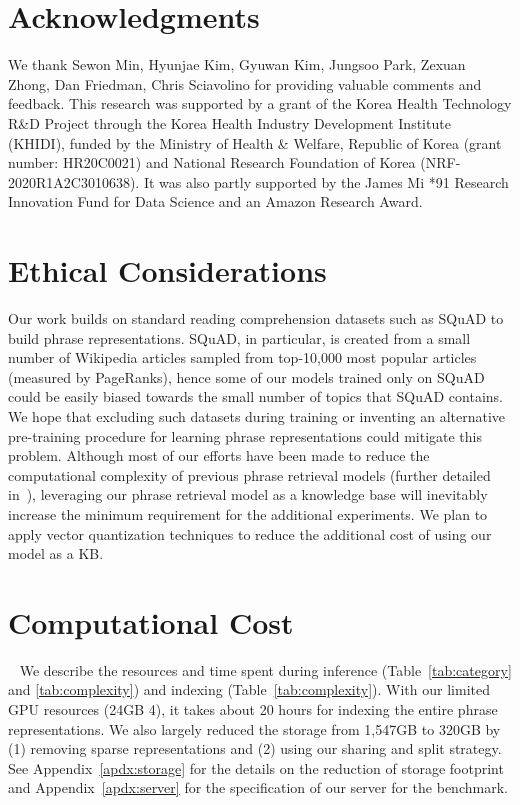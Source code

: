 \documentclass[11pt,a4paper]{article}
\begin{document}
\vspace{1em}
\section*{Acknowledgments}
We thank Sewon Min, Hyunjae Kim, Gyuwan Kim, Jungsoo Park, Zexuan Zhong, Dan Friedman, Chris Sciavolino for providing valuable comments and feedback.
This research was supported by a grant of the Korea Health Technology R\&D Project through the Korea Health Industry Development Institute (KHIDI), funded by the Ministry of Health \& Welfare, Republic of Korea (grant number: HR20C0021) and National Research Foundation of Korea (NRF-2020R1A2C3010638).
It was also partly supported by the James Mi *91 Research Innovation Fund for Data Science and an Amazon Research Award.
\clearpage

\section*{Ethical Considerations}\label{sec:ethics}
Our work builds on standard reading comprehension datasets such as SQuAD to build phrase representations.
SQuAD, in particular, is created from a small number of Wikipedia articles sampled from top-10,000 most popular articles (measured by PageRanks), hence some of our models trained only on SQuAD could be easily biased towards the small number of topics that SQuAD contains.
We hope that excluding such datasets during training or inventing an alternative pre-training procedure for learning phrase representations could mitigate this problem.
Although most of our efforts have been made to reduce the computational complexity of previous phrase retrieval models (further detailed in~), leveraging our phrase retrieval model as a knowledge base will inevitably increase the minimum requirement for the additional experiments. We plan to apply vector quantization techniques to reduce the additional cost of using our model as a KB.
 





\clearpage
\appendix
\setcounter{table}{0}
\renewcommand{\thetable}{\Alph{section}.\arabic{table}}

\section{Computational Cost}~\label{apdx:complexity}
We describe the resources and time spent during inference (Table~\ref{tab:category} and \ref{tab:complexity}) and indexing (Table~\ref{tab:complexity}).
With our limited GPU resources (24GB  4), it takes about 20 hours for indexing the entire phrase representations.
We also largely reduced the storage from 1,547GB to 320GB by (1) removing sparse representations and (2) using our sharing and split strategy.
See Appendix~\ref{apdx:storage} for the details on the reduction of storage footprint and Appendix~\ref{apdx:server} for the specification of our server for the benchmark.
\end{document}

